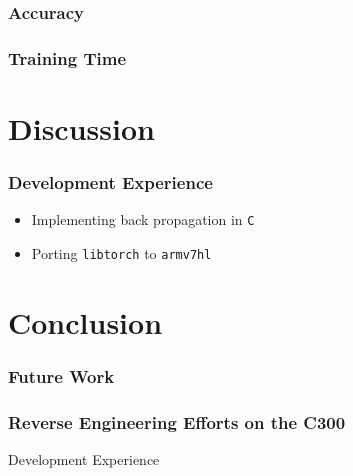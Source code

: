 \documentclass{beamer}
\begin{document}
\begin{frame}
  \frametitle{Accuracy}

  \begin{figure}[!ht]
    \centering
    \scalebox{0.52}{
      }
  \end{figure}

\end{frame}

\begin{frame}
  \frametitle{Training Time}

  \begin{figure}[!ht]
    \centering
    \resizebox{\columnwidth}{!}{%
    }
  \end{figure}

\end{frame}

\section{Discussion}

\begin{frame}
  \frametitle{Development Experience}

  \begin{itemize}
    \item Implementing back propagation in \texttt{C}
    \item Porting \texttt{libtorch} to \texttt{armv7hl}
  \end{itemize}

\end{frame}

\section{Conclusion}

\begin{frame}
  \frametitle{Future Work}

\end{frame}

\begin{frame}[fragile]
  \frametitle{Reverse Engineering Efforts on the C300}

  Development Experience

\end{frame}
\end{document}
